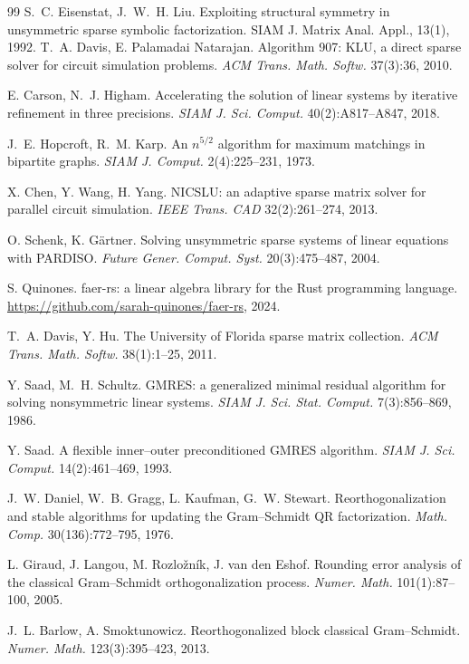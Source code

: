 \documentclass[11pt,a4paper]{article}
\begin{document}
\begin{thebibliography}{99}
 S.~C. Eisenstat, J.~W.~H. Liu. Exploiting structural symmetry in
unsymmetric sparse symbolic factorization. SIAM J. Matrix Anal. Appl., 13(1), 1992.
 T.~A. Davis, E. Palamadai Natarajan. Algorithm 907: KLU, a direct sparse
solver for circuit simulation problems. \emph{ACM Trans. Math. Softw.} 37(3):36, 2010.

 E. Carson, N.~J. Higham. Accelerating the solution of linear
systems by iterative refinement in three precisions. \emph{SIAM J. Sci. Comput.}
40(2):A817--A847, 2018.

 J.~E. Hopcroft, R.~M. Karp. An $n^{5/2}$ algorithm for maximum
matchings in bipartite graphs. \emph{SIAM J. Comput.} 2(4):225--231, 1973.

 X. Chen, Y. Wang, H. Yang. NICSLU: an adaptive sparse matrix solver for
parallel circuit simulation. \emph{IEEE Trans. CAD} 32(2):261--274, 2013.

 O. Schenk, K. G\"artner. Solving unsymmetric sparse systems of linear
equations with PARDISO. \emph{Future Gener. Comput. Syst.} 20(3):475--487, 2004.

 S. Quinones. faer-rs: a linear algebra library for the Rust programming
language. \url{https://github.com/sarah-quinones/faer-rs}, 2024.

 T.~A. Davis, Y. Hu. The University of Florida sparse matrix
collection. \emph{ACM Trans. Math. Softw.} 38(1):1--25, 2011.

 Y. Saad, M.~H. Schultz. GMRES: a generalized minimal residual
algorithm for solving nonsymmetric linear systems. \emph{SIAM J. Sci. Stat. Comput.}
7(3):856--869, 1986.

 Y. Saad. A flexible inner--outer preconditioned GMRES algorithm.
\emph{SIAM J. Sci. Comput.} 14(2):461--469, 1993.

 J.~W. Daniel, W.~B. Gragg, L. Kaufman, G.~W. Stewart. Reorthogonalization
and stable algorithms for updating the Gram--Schmidt QR factorization. \emph{Math. Comp.}
30(136):772--795, 1976.

 L. Giraud, J. Langou, M. Rozlo\v{z}n\'ik, J. van den Eshof. Rounding
error analysis of the classical Gram--Schmidt orthogonalization process. \emph{Numer.
Math.} 101(1):87--100, 2005.

 J.~L. Barlow, A. Smoktunowicz. Reorthogonalized block classical
Gram--Schmidt. \emph{Numer. Math.} 123(3):395--423, 2013.


\end{thebibliography}
\end{document}
